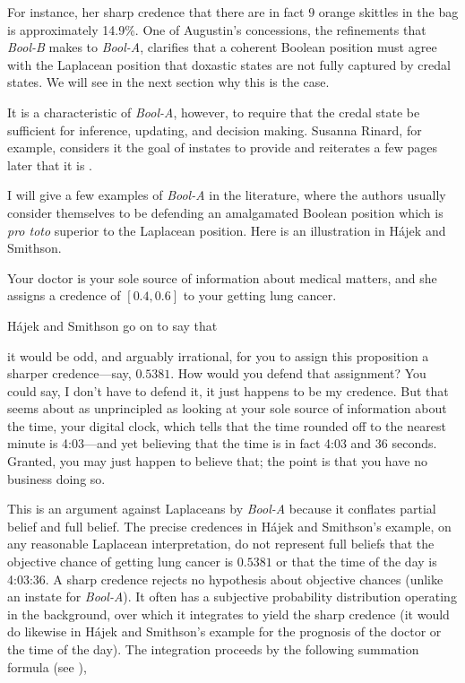 \documentclass[11pt]{article}
\newcommand{\anderson}[0]{\textit{Bool-A}}
\newcommand{\augustin}[0]{\textit{Bool-B}}
\begin{document}
For instance, her sharp credence that there are in fact $9$ orange
skittles in the bag is approximately 14.9\%. One of Augustin's
concessions, the refinements that {\augustin} makes to {\anderson},
clarifies that a coherent Boolean position must agree with the
Laplacean position that doxastic states are not fully captured by
credal states. We will see in the next section why this is the case.

It is a characteristic of {\anderson}, however, to require that
the credal state be sufficient for inference, updating, and decision
making. Susanna Rinard, for example, considers it the goal of instates
to provide   and reiterates a few pages later
that it is 
.

I will give a few examples of {\anderson} in the literature, where the
authors usually consider themselves to be defending an amalgamated
Boolean position which is \emph{pro toto} superior to the Laplacean
position. Here is an illustration in H{\'a}jek and Smithson.

\begin{quotex}
  \label{ex:crude} Your doctor is your
  sole source of information about medical matters, and she assigns a
  credence of $[0.4,0.6]$ to your getting lung cancer.
\end{quotex}

H{\'a}jek and Smithson go on to say that 

\begin{quotex}
  it would be odd, and arguably irrational, for you to assign this
  proposition a sharper credence---say, $0.5381$. How would you defend
  that assignment? You could say, I don't have to defend it, it just
  happens to be my credence. But that seems about as unprincipled as
  looking at your sole source of information about the time, your
  digital clock, which tells that the time rounded off to the nearest
  minute is 4:03---and yet believing that the time is in fact 4:03 and
  36 seconds. Granted, you may just happen to believe that; the point
  is that you have no business doing so.
\end{quotex}

This is an argument against Laplaceans by {\anderson} because it
conflates partial belief and full belief. The precise credences in
H{\'a}jek and Smithson's example, on any reasonable Laplacean
interpretation, do not represent full beliefs that the objective
chance of getting lung cancer is $0.5381$ or that the time of the day
is 4:03:36. A sharp credence rejects no hypothesis about objective
chances (unlike an instate for {\anderson}). It often has a subjective
probability distribution operating in the background, over which it
integrates to yield the sharp credence (it would do likewise in
H{\'a}jek and Smithson's example for the prognosis of the doctor or
the time of the day). The integration proceeds by the
following summation formula (see ),
\end{document}
